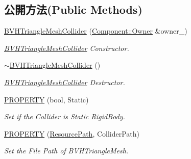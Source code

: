 \subsection*{公開方法(Public Methods)}
\begin{DoxyCompactItemize}
\item 
\hyperlink{class_magnum_1_1_b_v_h_triangle_mesh_collider_a8d0008d2099e2b218c083788adedad18}{B\+V\+H\+Triangle\+Mesh\+Collider} (\hyperlink{class_magnum_1_1_component_1_1_owner}{Component\+::\+Owner} \&owner\+\_\+)
\begin{DoxyCompactList}\small\item\em \hyperlink{class_magnum_1_1_b_v_h_triangle_mesh_collider}{B\+V\+H\+Triangle\+Mesh\+Collider} Constructor. \end{DoxyCompactList}\item 
\hyperlink{class_magnum_1_1_b_v_h_triangle_mesh_collider_a5e1ace4b16a1451d6c7bd8f0f8c88ad8}{$\sim$\+B\+V\+H\+Triangle\+Mesh\+Collider} ()
\begin{DoxyCompactList}\small\item\em \hyperlink{class_magnum_1_1_b_v_h_triangle_mesh_collider}{B\+V\+H\+Triangle\+Mesh\+Collider} Destructor. \end{DoxyCompactList}\item 
\hyperlink{class_magnum_1_1_b_v_h_triangle_mesh_collider_af5e0c0bedc4b0dc65dd5f3b93699df6c}{P\+R\+O\+P\+E\+R\+TY} (bool, Static)
\begin{DoxyCompactList}\small\item\em Set if the Collider is Static Rigid\+Body. \end{DoxyCompactList}\item 
\hyperlink{class_magnum_1_1_b_v_h_triangle_mesh_collider_a9f53d0f931699abd2a4710dcf67328ed}{P\+R\+O\+P\+E\+R\+TY} (\hyperlink{class_magnum_1_1_resource_path}{Resource\+Path}, Collider\+Path)
\begin{DoxyCompactList}\small\item\em Set the File Path of B\+V\+H\+Triangle\+Mesh. \end{DoxyCompactList}\end{DoxyCompactItemize}
